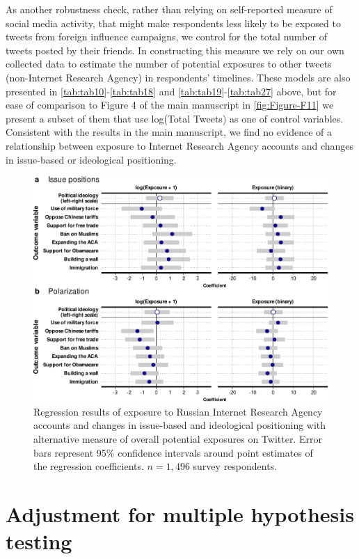 \documentclass[
  12pt,
]{article}
\begin{document}
As another robustness check, rather than relying on self-reported measure of social media activity, that might make respondents less likely to be exposed to tweets from foreign influence campaigns, we control for the total number of tweets posted by their friends. In constructing this measure we rely on our own collected data to estimate the number of potential exposures to other tweets (non-Internet Research Agency) in respondents' timelines. These models are also presented in \ref{tab:tab10}-\ref{tab:tab18} and \ref{tab:tab19}-\ref{tab:tab27} above, but for ease of comparison to Figure 4 of the main manuscript in \autoref{fig:Figure-F11} we present a subset of them that use log(Total Tweets) as one of control variables. Consistent with the results in the main manuscript, we find no evidence of a relationship between exposure to Internet Research Agency accounts and changes in issue-based or ideological positioning.

\begin{figure}
\centering
\includegraphics{Appendix_files/figure-latex/Figure-F11-1.pdf}
\caption{\label{fig:Figure-F11}Regression results of exposure to Russian Internet Research Agency accounts and changes in issue-based and ideological positioning with alternative measure of overall potential exposures on Twitter. Error bars represent 95\% confidence intervals around point estimates of the regression coefficients. \(n = 1,496\) survey respondents.}
\end{figure}

\clearpage

\hypertarget{adjustment-for-multiple-hypothesis-testing}{%
\section{Adjustment for multiple hypothesis testing}\label{adjustment-for-multiple-hypothesis-testing}}
\end{document}
